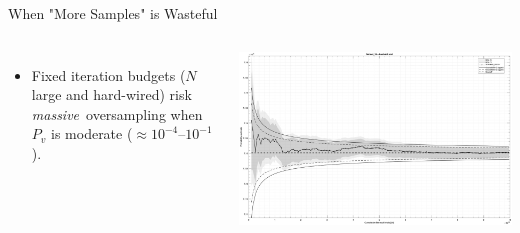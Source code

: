\begin{frame}{When "More Samples" is Wasteful}
  \begin{columns}
      \footnotesize
      \begin{itemize}
        \item Fixed iteration budgets ($N$ large and hard-wired) risk \emph{massive}\, oversampling when $P_v$ is moderate (\(\approx10^{-4}\)–\(10^{-1}\)).
      \end{itemize}
      \centering
      \includegraphics[width=0.95\linewidth]{2_framework/research_objective_3_mc_sampling/conv_fig_02.eps} %
      \vspace{-6pt}
  \end{columns}
\end{frame}